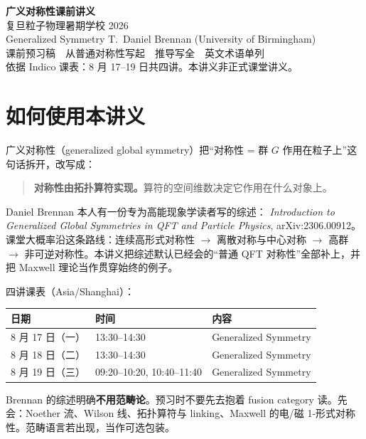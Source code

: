 \documentclass[11pt,a4paper]{article}
\theoremstyle{definition}
\theoremstyle{plain}
\theoremstyle{remark}
\begin{document}
\begin{center}
{\LARGE\bfseries 广义对称性课前讲义}\\[0.45em]
{\large 复旦粒子物理暑期学校 2026}\\[0.25em]
{\large Generalized Symmetry \quad T.\ Daniel Brennan (University of Birmingham)}\\[0.8em]
{\normalsize 课前预习稿　从普通对称性写起　推导写全　英文术语单列}\\[0.35em]
{\small 依据 Indico 课表：8 月 17--19 日共四讲。本讲义非正式课堂讲义。}
\end{center}

\tableofcontents
\newpage

\section{如何使用本讲义}

广义对称性（generalized global symmetry）把``对称性 = 群 $G$ 作用在粒子上''这句话拆开，改写成：

\begin{quote}
\textbf{对称性由拓扑算符实现。}算符的空间维数决定它作用在什么对象上。
\end{quote}

Daniel Brennan 本人有一份专为高能现象学读者写的综述：
\emph{Introduction to Generalized Global Symmetries in QFT and Particle Physics}, arXiv:2306.00912。
课堂大概率沿这条路线：连续高形式对称性 $\to$ 离散对称与中心对称 $\to$ 高群 $\to$ 非可逆对称性。本讲义把综述默认已经会的``普通 QFT 对称性''全部补上，并把 Maxwell 理论当作贯穿始终的例子。

四讲课表（Asia/Shanghai）：

\begin{center}
\begin{tabular}{lll}
\toprule
日期 & 时间 & 内容 \\
\midrule
8 月 17 日（一） & 13:30--14:30 & Generalized Symmetry \\
8 月 18 日（二） & 13:30--14:30 & Generalized Symmetry \\
8 月 19 日（三） & 09:20--10:20, 10:40--11:40 & Generalized Symmetry \\
\bottomrule
\end{tabular}
\end{center}

\begin{hearbox}
Brennan 的综述明确\textbf{不用范畴论}。预习时不要先去抱着 fusion category 读。先会：Noether 流、Wilson 线、拓扑算符与 linking、Maxwell 的电/磁 1-形式对称性。范畴语言若出现，当作可选包装。
\end{hearbox}
\end{document}
